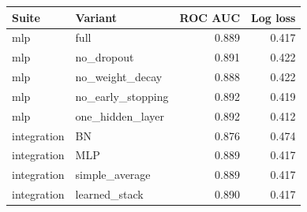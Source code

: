 \begin{tabular}{llrr}
\toprule
Suite & Variant & ROC AUC & Log loss \\
\midrule
mlp & full & 0.889 & 0.417 \\
mlp & no\_dropout & 0.891 & 0.422 \\
mlp & no\_weight\_decay & 0.888 & 0.422 \\
mlp & no\_early\_stopping & 0.892 & 0.419 \\
mlp & one\_hidden\_layer & 0.892 & 0.412 \\
integration & BN & 0.876 & 0.474 \\
integration & MLP & 0.889 & 0.417 \\
integration & simple\_average & 0.889 & 0.417 \\
integration & learned\_stack & 0.890 & 0.417 \\
\bottomrule
\end{tabular}

